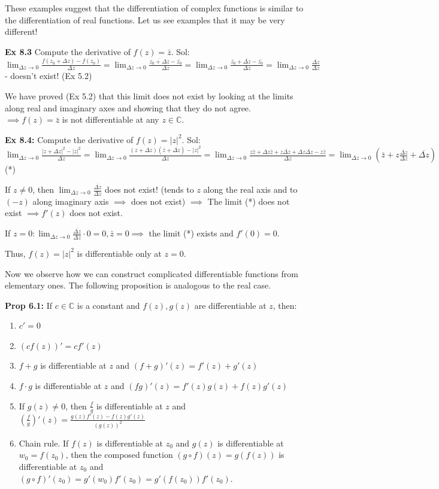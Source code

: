 \documentclass{article}
\begin{document}
These examples suggest that the differentiation of complex functions is similar to the differentiation of real functions. Let us see examples that it may be very different!

\textbf{Ex 8.3} Compute the derivative of $f(z) = \bar{z}$.
Sol: $\lim_{\Delta z \to 0} \frac{f(z_0 + \Delta z) - f(z_0)}{\Delta z} = \lim_{\Delta z \to 0} \frac{\overline{z_0 + \Delta z} - \bar{z_0}}{\Delta z} = \lim_{\Delta z \to 0} \frac{\bar{z_0} + \overline{\Delta z} - \bar{z_0}}{\Delta z} = \lim_{\Delta z \to 0} \frac{\overline{\Delta z}}{\Delta z}$ - doesn't exist! (Ex 5.2)

We have proved (Ex 5.2) that this limit does not exist by looking at the limits along real and imaginary axes and showing that they do not agree.
$\implies f(z) = \bar{z}$ is not differentiable at any $z \in \mathbb{C}$.

\textbf{Ex 8.4:} Compute the derivative of $f(z) = |z|^2$.
Sol: $\lim_{\Delta z \to 0} \frac{|z + \Delta z|^2 - |z|^2}{\Delta z} = \lim_{\Delta z \to 0} \frac{(z + \Delta z)(\bar{z} + \overline{\Delta z}) - |z|^2}{\Delta z} = \lim_{\Delta z \to 0} \frac{z\bar{z} + \Delta z \bar{z} + z\overline{\Delta z} + \Delta z \overline{\Delta z} - z\bar{z}}{\Delta z} = \lim_{\Delta z \to 0} \left(\bar{z} + z\frac{\overline{\Delta z}}{\Delta z} + \overline{\Delta z}\right)$ (*)

If $z \neq 0$, then $\lim_{\Delta z \to 0} \frac{\overline{\Delta z}}{\Delta z}$ does not exist! (tends to $z$ along the real axis and to $(-z)$ along imaginary axis $\implies$ does not exist) $\implies$ The limit (*) does not exist $\implies f'(z)$ does not exist.

If $z = 0: \lim_{\Delta z \to 0} \frac{\overline{\Delta z}}{\Delta z} \cdot 0 = 0, \bar{z} = 0 \implies$ the limit (*) exists and $f'(0) = 0$.

Thus, $f(z) = |z|^2$ is differentiable only at $z = 0$.

Now we observe how we can construct complicated differentiable functions from elementary ones. The following proposition is analogous to the real case.

\textbf{Prop 6.1:} If $c \in \mathbb{C}$ is a constant and $f(z), g(z)$ are differentiable at $z$, then:
\begin{enumerate}
    \item $c' = 0$
    \item $(cf(z))' = cf'(z)$
    \item $f + g$ is differentiable at $z$ and $(f + g)'(z) = f'(z) + g'(z)$
    \item $f \cdot g$ is differentiable at $z$ and $(fg)'(z) = f'(z)g(z) + f(z)g'(z)$
    \item If $g(z) \neq 0$, then $\frac{f}{g}$ is differentiable at $z$ and $\left(\frac{f}{g}\right)'(z) = \frac{g(z)f'(z) - f(z)g'(z)}{(g(z))^2}$
    \item Chain rule. If $f(z)$ is differentiable at $z_0$ and $g(z)$ is differentiable at $w_0 = f(z_0)$, then the composed function $(g \circ f)(z) = g(f(z))$ is differentiable at $z_0$ and $(g \circ f)'(z_0) = g'(w_0)f'(z_0) = g'(f(z_0))f'(z_0)$.
\end{enumerate}
\end{document}
